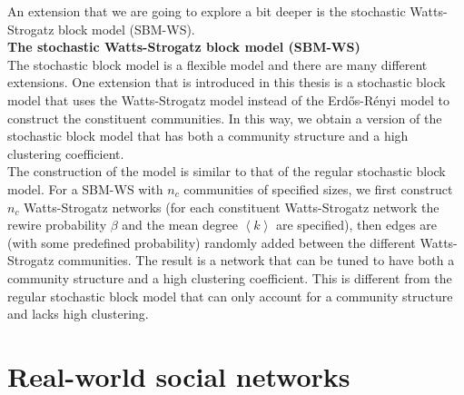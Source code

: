 \documentclass[11 pt , letterpaper , twoside , openright]{book}
\begin{document}
\newline
An extension that we are going to explore a bit deeper is the stochastic Watts-Strogatz block model (SBM-WS).\\
\newline
\textbf{The stochastic Watts-Strogatz block model (SBM-WS)}\\
\newline
The stochastic block model is a flexible model and there are many different extensions. One extension that is introduced in this thesis is a stochastic block model that uses the Watts-Strogatz model instead of the Erd\H{o}s-R\'{e}nyi model to construct the constituent communities. In this way, we obtain a version of the stochastic block model that has both a community structure and a high clustering coefficient.\\
\newline
The construction of the model is similar to that of the regular stochastic block model. For a SBM-WS with $n_c$ communities of specified sizes, we first construct $n_c$ Watts-Strogatz networks (for each constituent Watts-Strogatz network the rewire probability $\beta$ and the mean degree $\left<k\right>$ are specified), then edges are (with some predefined probability) randomly added between the different Watts-Strogatz communities. The result is a network that can be tuned to have both a community structure and a high clustering coefficient. This is different from the regular stochastic block model that can only account for a community structure and lacks high clustering.

\section{Real-world social networks}
\end{document}
